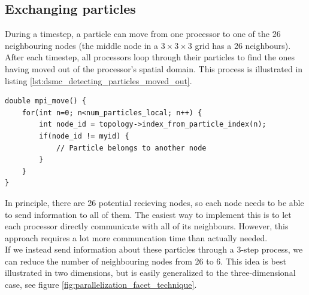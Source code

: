 \subsection{Exchanging particles}
\label{sec:dsmc_parallelization_exchange_particles}
During a timestep, a particle can move from one processor to one of the 26 neighbouring nodes (the middle node in a $3\times3\times3$ grid has a 26 neighbours). After each timestep, all processors loop through their particles to find the ones having moved out of the processor's spatial domain. This process is illustrated in listing \ref{lst:dsmc_detecting_particles_moved_out}.
\begin{lstlisting}[caption=Detecting which particles moved out of a processor's spatial domain., label=lst:dsmc_detecting_particles_moved_out]
double mpi_move() {
	for(int n=0; n<num_particles_local; n++) {
		int node_id = topology->index_from_particle_index(n);
		if(node_id != myid) {
			// Particle belongs to another node
		}
	}
}
\end{lstlisting}
In principle, there are 26 potential recieving nodes, so each node needs to be able to send information to all of them. The easiest way to implement this is to let each processor directly communicate with all of its neighbours. However, this approach requires a lot more communcation time than actually needed.\\
If we instead send information about these particles through a 3-step process, we can reduce the number of neighbouring nodes from 26 to 6. This idea is best illustrated in two dimensions, but is easily generalized to the three-dimensional case, see figure \ref{fig:parallelization_facet_technique}.
